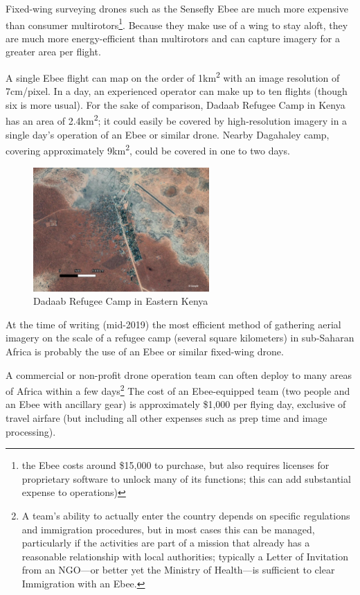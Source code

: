 \documentclass[a4paper,12pt,twoside]{article}
\begin{document}
Fixed-wing surveying drones such as the Sensefly Ebee are much more expensive than consumer multirotors\footnote{the Ebee costs around \$15,000 to purchase, but also requires licenses for proprietary software to unlock many of its functions; this can add substantial expense to operations)}. Because they make use of a wing to stay aloft, they are much more energy-efficient than multirotors and can capture imagery for a greater area per flight.

A single Ebee flight can map on the order of 1km\textsuperscript{2} with an image resolution of 7cm/pixel. In a day, an experienced operator can make up to ten flights (though six is more usual). For the sake of comparison, Dadaab Refugee Camp in Kenya has an area of 2.4km\textsuperscript{2}; it could easily be covered by high-resolution imagery in a single day's operation of an Ebee or similar drone. Nearby Dagahaley camp, covering approximately 9km\textsuperscript{2}, could be covered in one to two days.

\begin{figure}[H]
    \centering
    \includegraphics[width=0.6\textwidth]{images/dadaab.jpeg}
    \caption{Dadaab Refugee Camp in Eastern Kenya}
    \label{fig:Dadaab Refugee Camp}
\end{figure}

At the time of writing (mid-2019) the most efficient method of gathering aerial imagery on the scale of a refugee camp (several square kilometers) in sub-Saharan Africa is probably the use of an Ebee or similar fixed-wing drone. 

A commercial or non-profit drone operation team can often deploy to many areas of Africa within a few days\footnote{A team's ability to actually enter the country depends on specific regulations and immigration procedures, but in most cases this can be managed, particularly if the activities are part of a mission that already has a reasonable relationship with local authorities; typically a Letter of Invitation from an NGO---or better yet the Ministry of Health---is sufficient to clear Immigration with an Ebee.} The cost of an Ebee-equipped team (two people and an Ebee with ancillary gear) is approximately \$1,000 per flying day, exclusive of travel airfare (but including all other expenses such as prep time and image processing). 
\end{document}
